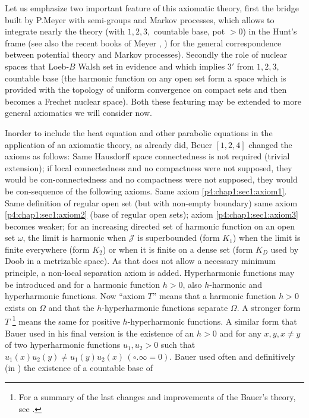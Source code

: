 Let us emphasize two important feature of this axiomatic theory, first
the bridge built by P.Meyer \cite{57} with semi-groups and Markov
processes, which allows to integrate nearly the theory (with $1,2,3,$
countable base, pot $>0$) in the Hunt's frame (see also the recent
books of Meyer \cite{58}, \cite{59}) for the general correspondence between
potential theory and Markov processes). Secondly the role of nuclear
spaces that Loeb-$B$ Walsh set in evidence \cite{54} and which implies
$3'$ from $1,2,3,$ countable base (the harmonic function on any open
set form a space which is provided with the topology of uniform
convergence on compact sets and then becomes a Frechet nuclear
space). Both these featuring may be extended to more general
axiomatics we  will consider now. 

In\pageoriginale order to include the heat equation and other parabolic equations in
the application of an axiomatic theory, as already did, Beuer
$[1,2,4]$ changed the axioms as follows: Same Hausdorff space
connectedness is not required (trivial extension); if local
connectedness and no compactness were not supposed, they would be
con-connectedness and no compactness were not supposed, they would be
con-sequence of the following axioms. Same axiom
\ref{p4:chap1:sec1:axiom1}. Same definition 
of regular open set (but with non-empty boundary) same axiom
\ref{p4:chap1:sec1:axiom2}  (base
of regular open sets); axiom \ref{p4:chap1:sec1:axiom3} becomes
weaker; for an increasing 
directed set of harmonic function on an open set $\omega$, the limit
is harmonic when $\mathcal{J}$ is superbounded (form $K_1$) when the
limit is finite everywhere (form $K_2$) or when it is finite on a
dense set (form $K_D$ used by Doob in a metrizable space). As that
does not allow a necessary minimum principle, a non-local separation
axiom is added. Hyperharmonic functions may be introduced and for a
harmonic function $h>0$, also $h$-harmonic and hyperharmonic
functions. Now ``axiom $T$'' means that a harmonic function $h>0$
exists on $\Omega$ and that the $h$-hyperharmonic functions separate
$\Omega$. A stronger form $T$ \footnote{For a summary of the last
  changes and improvements of the Bauer's theory, see \cite{6}.} means the
same for positive $h$-hyperharmonic functions. A similar form that
Bauer used in his final version \cite{4} is the existence of an $h>0$
and for any $x,y,x\neq y$ of two hyperharmonic functions $u_1,u_2 >0$
such that $u_1(x)u_2(y)\neq u_1 (y)u_2(x)\, (\circ. \infty =0)$. Bauer used
often and definitively (in \cite{4}) the existence of a countable base of
